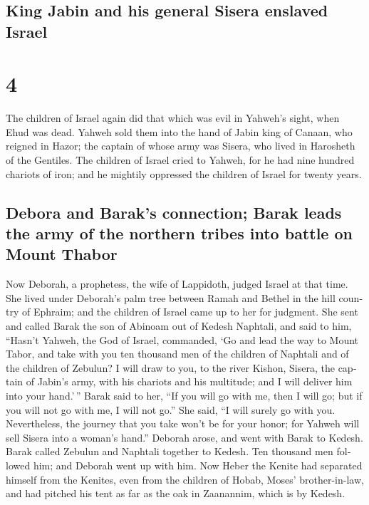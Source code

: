 \begin{paracol}{2}
\switchcolumn
\begin{otherlanguage}{english}

\hypertarget{king-jabin-and-his-general-sisera-enslaved-israel}{%
\subsection{King Jabin and his general Sisera enslaved
Israel}\label{king-jabin-and-his-general-sisera-enslaved-israel}}

\hypertarget{section-7}{%
\section{4}\label{section-7}}

 The children of Israel again did that which was evil in
Yahweh's sight, when Ehud was dead.  Yahweh sold them into
the hand of Jabin king of Canaan, who reigned in Hazor; the captain of
whose army was Sisera, who lived in Harosheth of the Gentiles.
 The children of Israel cried to Yahweh, for he had nine
hundred chariots of iron; and he mightily oppressed the children of
Israel for twenty years.

\hypertarget{debora-and-baraks-connection-barak-leads-the-army-of-the-northern-tribes-into-battle-on-mount-thabor}{%
\subsection{Debora and Barak's connection; Barak leads the army of the
northern tribes into battle on Mount
Thabor}\label{debora-and-baraks-connection-barak-leads-the-army-of-the-northern-tribes-into-battle-on-mount-thabor}}

 Now Deborah, a prophetess, the wife of Lappidoth, judged
Israel at that time.  She lived under Deborah's palm tree
between Ramah and Bethel in the hill country of Ephraim; and the
children of Israel came up to her for judgment.  She sent
and called Barak the son of Abinoam out of Kedesh Naphtali, and said to
him, ``Hasn't Yahweh, the God of Israel, commanded, `Go and lead the way
to Mount Tabor, and take with you ten thousand men of the children of
Naphtali and of the children of Zebulun?  I will draw to
you, to the river Kishon, Sisera, the captain of Jabin's army, with his
chariots and his multitude; and I will deliver him into your hand.'\,''
 Barak said to her, ``If you will go with me, then I will
go; but if you will not go with me, I will not go.''  She
said, ``I will surely go with you. Nevertheless, the journey that you
take won't be for your honor; for Yahweh will sell Sisera into a woman's
hand.'' Deborah arose, and went with Barak to Kedesh. 
Barak called Zebulun and Naphtali together to Kedesh. Ten thousand men
followed him; and Deborah went up with him.  Now Heber
the Kenite had separated himself from the Kenites, even from the
children of Hobab, Moses' brother-in-law, and had pitched his tent as
far as the oak in Zaanannim, which is by Kedesh.


\end{otherlanguage}
\end{paracol}
